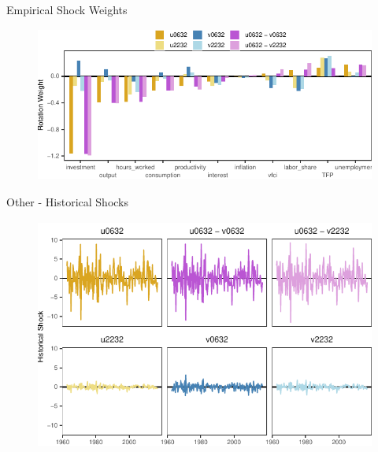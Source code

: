 \begin{frame}{Empirical Shock Weights }
    
    \vspace{-0.25cm}
    
    \begin{figure}
        \includegraphics[height = 2in]{figs/fig11_emp_weights.pdf}
    \end{figure}

\end{frame}


\begin{frame}{Other - Historical Shocks }
    
    \vspace{-0.25cm}

    \begin{figure}
        \includegraphics[height = 3in]{figs/fig8_hist_shocks.pdf}
    \end{figure}

\end{frame}



